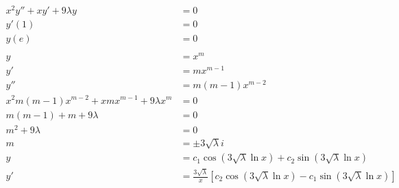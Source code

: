 \documentclass{article}
\begin{document}
\setcounter{subsubsection}{16}
\subsubsection{}

\begin{align*}
  x^2 y'' + x y' + 9 \lambda y                            & = 0                                                                                                  \\
  y'(1)                                                   & = 0                                                                                                  \\
  y(e)                                                    & = 0                                                                                                  \\ \\
  y                                                       & = x^m                                                                                                \\
  y'                                                      & = m x^{m - 1}                                                                                        \\
  y''                                                     & = m (m - 1) x^{m - 2}                                                                                \\
  x^2 m (m - 1) x^{m - 2} + x m x^{m - 1} + 9 \lambda x^m & = 0                                                                                                  \\
  m (m - 1) + m + 9 \lambda                               & = 0                                                                                                  \\
  m^2 + 9 \lambda                                         & = 0                                                                                                  \\
  m                                                       & = \pm 3 \sqrt{\lambda} i                                                                             \\
  y                                                       & = c_1 \cos (3 \sqrt{\lambda} \ln x) + c_2 \sin (3 \sqrt{\lambda} \ln x)                              \\
  y'                                                      & = \frac{3 \sqrt{\lambda}}{x} [c_2 \cos (3 \sqrt{\lambda} \ln x) - c_1 \sin (3 \sqrt{\lambda} \ln x)] \\

\end{align*}
\end{document}
